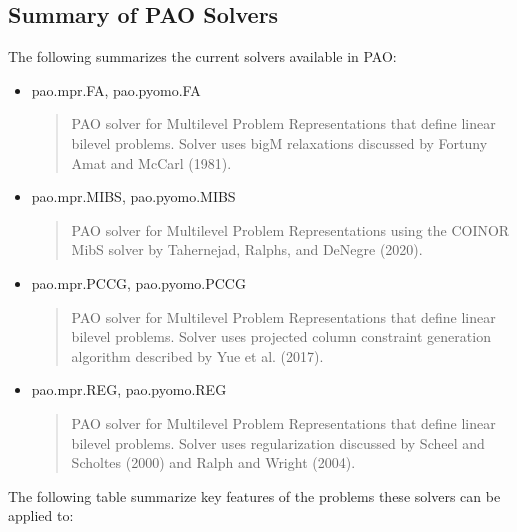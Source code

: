 \documentclass[letterpaper,10pt,english]{sphinxmanual}
\begin{document}
\subsection{Summary of PAO Solvers}
\label{\detokenize{solvers:summary-of-pao-solvers}}
The following summarizes the current solvers available in PAO:
\begin{itemize}
\item {} 
pao.mpr.FA, pao.pyomo.FA
\begin{quote}

PAO solver for Multilevel Problem Representations that define linear
bilevel problems.  Solver uses big\sphinxhyphen{}M relaxations discussed by Fortuny\sphinxhyphen{}
Amat and McCarl (1981).
\end{quote}

\item {} 
pao.mpr.MIBS, pao.pyomo.MIBS
\begin{quote}

PAO solver for Multilevel Problem Representations using the COIN\sphinxhyphen{}OR
MibS solver by Tahernejad, Ralphs, and DeNegre (2020).
\end{quote}

\item {} 
pao.mpr.PCCG, pao.pyomo.PCCG
\begin{quote}

PAO solver for Multilevel Problem Representations that define linear
bilevel problems. Solver uses projected column constraint generation
algorithm described by Yue et al. (2017).
\end{quote}

\item {} 
pao.mpr.REG, pao.pyomo.REG
\begin{quote}

PAO solver for Multilevel Problem Representations that define linear
bilevel problems.  Solver uses regularization discussed by Scheel and
Scholtes (2000) and Ralph and Wright (2004).
\end{quote}

\end{itemize}

The following table summarize key features of the problems these solvers
can be applied to:
\end{document}
